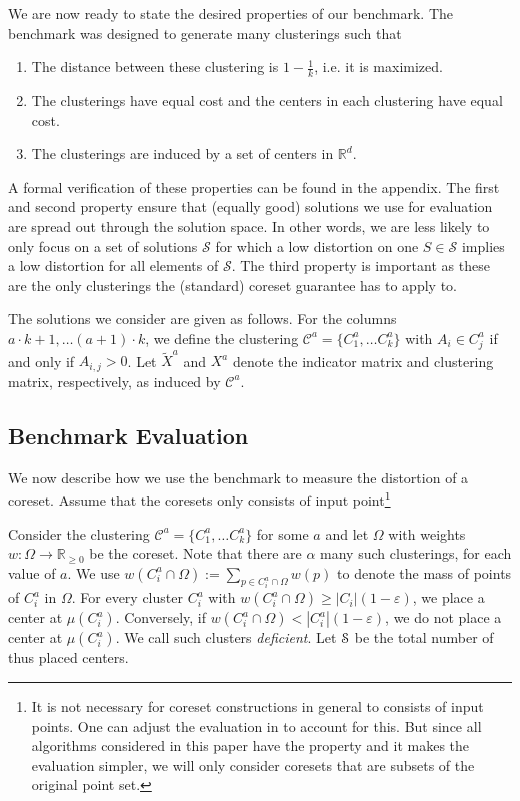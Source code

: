 We are now ready to state the desired properties of our benchmark. The benchmark was designed to generate many clusterings such that
\begin{enumerate}
\item The distance between these clustering is $1-\frac{1}{k}$, i.e. it is maximized.
\item The clusterings have equal cost and the centers in each clustering have equal cost.
\item The clusterings are induced by a set of centers in $\mathbb{R}^d$.
\end{enumerate}

A formal verification of these properties can be found in the appendix.
The first and second property ensure that (equally good) solutions we use for evaluation are spread out through the solution space. In other words, we are less likely to only focus on a set of solutions $\mathcal{S}$ for which a low distortion on one $S\in\mathcal{S}$ implies a low distortion for all elements of $\mathcal{S}$.
The third property is important as these are the only clusterings the (standard) coreset guarantee has to apply to. 

The solutions we consider are given as follows. For the columns $a\cdot k+1,\ldots (a+1)\cdot k$, we define the clustering $\mathcal{C}^{a} = \{C_1^a,\ldots C_k^a\}$ with 
$A_i\in C_j^a$ if and only if $A_{i,j} > 0$. Let $\tilde X^a$ and $X^{a}$ denote the indicator matrix and clustering matrix, respectively, as induced by $\mathcal{C}^{a}$.



\subsection{Benchmark Evaluation}

We now describe how we use the benchmark to measure the distortion of a coreset. Assume that the coresets only consists of input point\footnote{It is not necessary for coreset constructions in general to consists of input points. One can adjust the evaluation in to account for this. But since all algorithms considered in this paper have the property and it makes the evaluation simpler, we will only consider coresets that are subsets of the original point set.}

Consider the clustering $\mathcal{C}^{a} = \{C_1^a,\ldots C_k^a\}$ for some $a$ and let $\Omega$ with weights $w:\Omega\rightarrow \mathbb{R}_{\geq 0}$ be the coreset. 
Note that there are $\alpha$ many such clusterings, for each value of $a$.
We use $w(C_i^a \cap \Omega):=\sum_{p\in C_i^a \cap \Omega} w(p)$ to denote the mass of points of $C_i^a$ in $\Omega$.
For every cluster $C_i^a$ with $w(C_i^a \cap \Omega)\geq |C_i| (1-\varepsilon)$, we place a center at $\mu(C_i^a)$. Conversely, if $w(C_i^a \cap \Omega)< |C_i^a| (1-\varepsilon)$, we do not place a center at $\mu(C_i^a)$. We call such clusters \emph{deficient}. Let $\mathcal{S}$ be the total number of thus placed centers.

